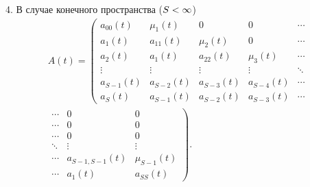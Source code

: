 \begin{multicols}{2}
\vspace*{2pt}

4. В случае конечного пространства ($S \hm< \infty$)
\begin{multline*}
A\left( t\right) =
 \left(
\begin{array}{ccccc}
a_{00}(t)  & \mu_1(t)   & 0          & 0          &\cdots \\
a_1(t)     & a_{11}(t)  & \mu_2(t)   & 0          &\cdots  \\
a_2(t)     & a_1(t)     & a_{22}(t)  & \mu_3(t)   & \cdots \\
\vdots     & \vdots     & \vdots     & \vdots     & \ddots  \\
a_{S-1}(t) & a_{S-2}(t) & a_{S-3}(t) & a_{S-4}(t) & \cdots \\
a_{S}(t)   & a_{S-1}(t) & a_{S-2}(t) & a_{S-3}(t) & \cdots 
\end{array}
\right. \\[3pt]
 \left.
\begin{array}{ccc}
\cdots  & 0              & 0 \\
\cdots  & 0              & 0 \\
 \cdots & 0              & 0 \\
 \ddots & \vdots         & \vdots \\
\cdots & a_{S-1,S-1}(t) &\mu_{S-1}(t) \\
 \cdots & a_1(t)         & a_{SS}(t)
\end{array}
\right)\!.
\end{multline*}



\end{multicols}
